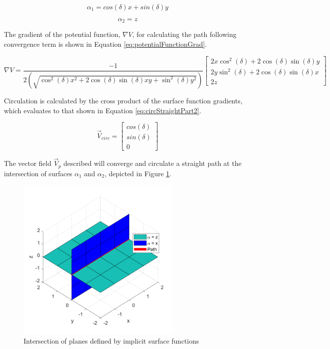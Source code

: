\documentclass[numbered,pdftex]{ohio-etd}
\begin{document}
\begin{equation}
\label{eq:pathFunction}
\alpha_1 = cos(\delta)x + sin(\delta)y
\end{equation}

\begin{equation}
\label{eq:pathFunctionZ}
\alpha_2 = z
\end{equation}



\noindent
The gradient of the potential function, $\nabla V$, for calculating the path following convergence term is shown in Equation \ref{eq:potentialFunctionGrad}.

\begin{equation}
\label{eq:potentialFunctionGrad}
\nabla V = \frac{-1}{2(\sqrt{\cos^2(\delta) x^2+2\cos(\delta)\sin(\delta) xy +\sin^2 (\delta) y^2})} \begin{bmatrix}
2x\cos^2(\delta) + 2\cos(\delta)\sin(\delta) y \\
2y\sin^2(\delta) + 2\cos(\delta)\sin(\delta) x \\
2z
\end{bmatrix}
\end{equation}

\noindent
Circulation is calculated by the cross product of the surface function gradients, which evaluates to that shown in Equation \ref{eq:circStraightPart2}.


\begin{equation}
\label{eq:circStraightPart2}
\overrightarrow{V}_{circ} = \begin{bmatrix}
cos(\delta) \\
sin(\delta) \\
0
\end{bmatrix}
\end{equation}

The vector field $\overrightarrow{V}_p$ described will converge and circulate a straight path at the intersection of surfaces $\alpha_1$ and $\alpha_2$, depicted in Figure \ref{fig:planeIntersection}.

\begin{figure}[H]
	\centering
	\includegraphics[width=8cm]{Figures/planeIntersection}
	\caption{Intersection of planes defined by implicit surface functions}
	\label{fig:planeIntersection}
\end{figure}
\end{document}
